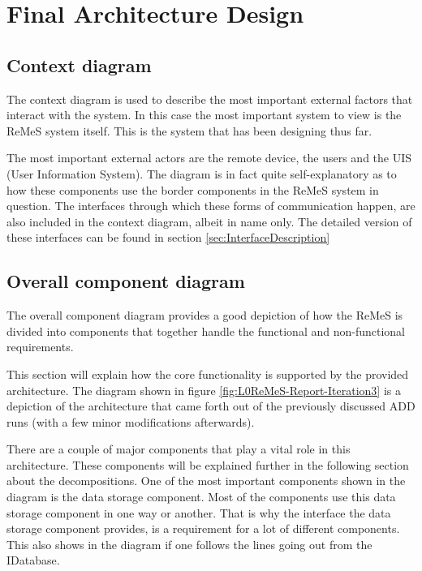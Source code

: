 \section{Final Architecture Design}
\label{sec:FinalArch}
\subsection{Context diagram}
The context diagram is used to describe the most important external factors
that interact with the system. In this case the most important system to view is the 
ReMeS system itself. This is the system that has been designing thus far.

The most important external actors are the remote device, the users and the UIS
(User Information System). The diagram is in fact quite self-explanatory as to how these
components use the border components in the ReMeS system in question. The interfaces
through which these forms of communication happen, are also included in the context diagram, 
albeit in name only. The detailed version of these interfaces can be found in section \ref{sec:InterfaceDescription}

\subsection{Overall component diagram}

The overall component diagram provides a good depiction of how the ReMeS is divided into 
components that together handle the functional and non-functional requirements.

This section will explain how the core functionality is supported by the provided architecture.
The diagram shown in figure \ref{fig:L0ReMeS-Report-Iteration3} is a depiction of the architecture that came forth out of the previously discussed ADD runs (with a few minor modifications afterwards).

There are a couple of major components that play a vital role in this architecture. These components will be explained further in the following section about the decompositions.
One of the most important components shown in the diagram is the data storage component. 
Most of the components use this data storage component in one way or another. That is why the interface the data storage component provides, is a requirement for a lot of different components. This also shows in the diagram if one follows the lines going out from the IDatabase. 

